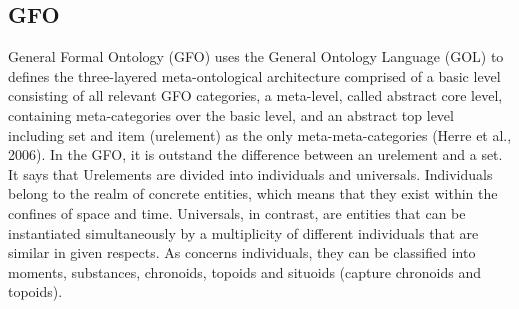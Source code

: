 \subsection{GFO}
General Formal Ontology (GFO) uses the General Ontology Language (GOL) to defines the three-layered meta-ontological architecture comprised of a basic level consisting of all relevant GFO categories, a meta-level, called abstract core level, containing meta-categories over the basic level, and an abstract top level including set and item (urelement) as the only meta-meta-categories (Herre et al., 2006).
In the GFO, it is outstand the difference between an urelement and a set. It says that Urelements are divided into individuals and universals. Individuals belong to the realm of concrete entities, which means that they exist within the confines of space and time. Universals, in contrast, are entities that can be instantiated simultaneously by a multiplicity of different individuals that are similar in given respects. As concerns individuals, they can be classified into moments, substances, chronoids, topoids and situoids (capture chronoids and topoids).
